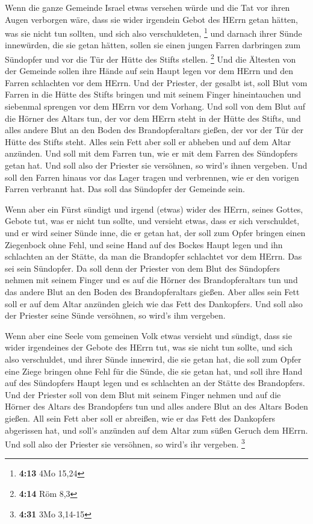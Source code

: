  Wenn die ganze Gemeinde Israel etwas versehen würde und
die Tat vor ihren Augen verborgen wäre, dass sie wider irgendein Gebot
des HErrn getan hätten, was sie nicht tun sollten, und sich also
verschuldeten, \footnote{\textbf{4:13} 4Mo 15,24}  und
darnach ihrer Sünde innewürden, die sie getan hätten, sollen sie einen
jungen Farren darbringen zum Sündopfer und vor die Tür der Hütte des
Stifts stellen. \footnote{\textbf{4:14} Röm 8,3}  Und die
Ältesten von der Gemeinde sollen ihre Hände auf sein Haupt legen vor dem
HErrn und den Farren schlachten vor dem HErrn.  Und der
Priester, der gesalbt ist, soll Blut vom Farren in die Hütte des Stifts
bringen  und mit seinem Finger hineintauchen und siebenmal
sprengen vor dem HErrn vor dem Vorhang.  Und soll von dem
Blut auf die Hörner des Altars tun, der vor dem HErrn steht in der Hütte
des Stifts, und alles andere Blut an den Boden des Brandopferaltars
gießen, der vor der Tür der Hütte des Stifts steht.  Alles
sein Fett aber soll er abheben und auf dem Altar anzünden. 
Und soll mit dem Farren tun, wie er mit dem Farren des Sündopfers getan
hat. Und soll also der Priester sie versöhnen, so wird's ihnen vergeben.
 Und soll den Farren hinaus vor das Lager tragen und
verbrennen, wie er den vorigen Farren verbrannt hat. Das soll das
Sündopfer der Gemeinde sein.

 Wenn aber ein Fürst sündigt und irgend (etwas) wider des
HErrn, seines Gottes, Gebote tut, was er nicht tun sollte, und versieht
etwas, dass er sich verschuldet,  und er wird seiner Sünde
inne, die er getan hat, der soll zum Opfer bringen einen Ziegenbock ohne
Fehl,  und seine Hand auf des Bockes Haupt legen und ihn
schlachten an der Stätte, da man die Brandopfer schlachtet vor dem
HErrn. Das sei sein Sündopfer.  Da soll denn der Priester
von dem Blut des Sündopfers nehmen mit seinem Finger und es auf die
Hörner des Brandopferaltars tun und das andere Blut an den Boden des
Brandopferaltars gießen.  Aber alles sein Fett soll er auf
dem Altar anzünden gleich wie das Fett des Dankopfers. Und soll also der
Priester seine Sünde versöhnen, so wird's ihm vergeben.

 Wenn aber eine Seele vom gemeinen Volk etwas versieht und
sündigt, dass sie wider irgendeines der Gebote des HErrn tut, was sie
nicht tun sollte, und sich also verschuldet,  und ihrer
Sünde innewird, die sie getan hat, die soll zum Opfer eine Ziege bringen
ohne Fehl für die Sünde, die sie getan hat,  und soll ihre
Hand auf des Sündopfers Haupt legen und es schlachten an der Stätte des
Brandopfers.  Und der Priester soll von dem Blut mit seinem
Finger nehmen und auf die Hörner des Altars des Brandopfers tun und
alles andere Blut an des Altars Boden gießen.  All sein
Fett aber soll er abreißen, wie er das Fett des Dankopfers abgerissen
hat, und soll's anzünden auf dem Altar zum süßen Geruch dem HErrn. Und
soll also der Priester sie versöhnen, so wird's ihr vergeben.
\footnote{\textbf{4:31} 3Mo 3,14-15}

